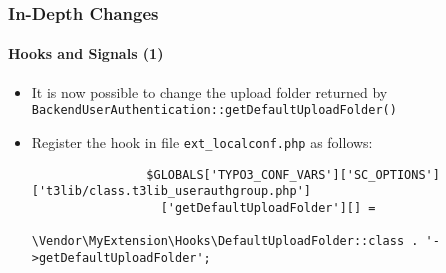\begin{frame}[fragile]
	\frametitle{In-Depth Changes}
	\framesubtitle{Hooks and Signals (1)}

	\lstset{basicstyle=\tiny\ttfamily}

	\begin{itemize}

		\item It is now possible to change the upload folder returned by
			\texttt{BackendUserAuthentication::getDefaultUploadFolder()}

		\item Register the hook in file \texttt{ext\_localconf.php} as follows:

			\begin{lstlisting}
				$GLOBALS['TYPO3_CONF_VARS']['SC_OPTIONS']['t3lib/class.t3lib_userauthgroup.php']
				  ['getDefaultUploadFolder'][] =
				  \Vendor\MyExtension\Hooks\DefaultUploadFolder::class . '->getDefaultUploadFolder';
			\end{lstlisting}

	\end{itemize}

\end{frame}

